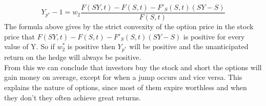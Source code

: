 \documentclass{article}
\begin{document}
\begin{equation}\label{eq:C1.1}
    Y_{p^{*}} - 1 = w_2 \frac{F(S Y, t) - F(S, t) - F'_S(S, t) (S Y - S)}{F(S, t)}
\end{equation}
The formula above gives by the strict convexity of the option price in the stock price that $F(S Y, t) - F(S, t) - F'_S(S, t) (S Y - S)$ is positive for every value of Y. So if $w_2^{*}$ is positive then $Y_{p^{*}}$ will be positive and the unanticipated return on the hedge will always be positive.\\
From this we can conclude that investors buy the stock and short the options will gain money on average, except for when a jump occurs and vice versa. This explains the nature of options, since most of them expire worthless and when they don't they often achieve great returns.
\end{document}
